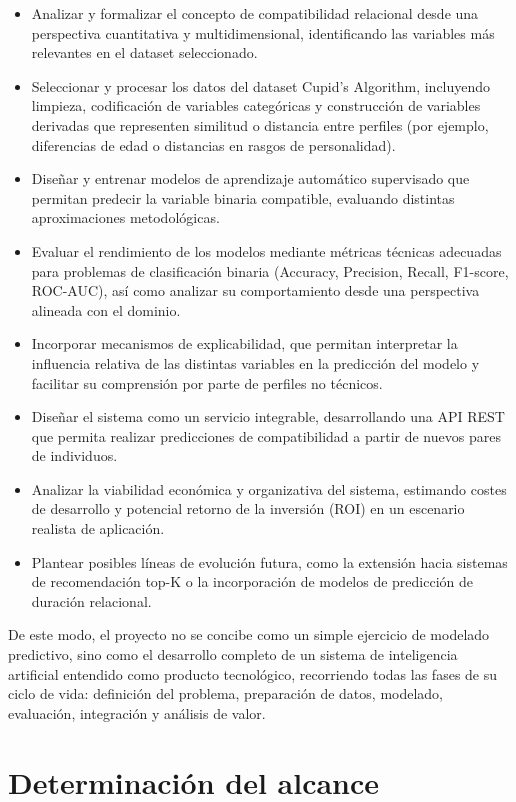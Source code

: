 \begin{itemize}
    \item Analizar y formalizar el concepto de compatibilidad relacional desde una perspectiva cuantitativa y multidimensional, identificando las variables más relevantes en el dataset seleccionado.
    \item Seleccionar y procesar los datos del dataset Cupid’s Algorithm, incluyendo limpieza, codificación de variables categóricas y construcción de variables derivadas que representen similitud o distancia entre perfiles (por ejemplo, diferencias de edad o distancias en rasgos de personalidad).
    \item Diseñar y entrenar modelos de aprendizaje automático supervisado que permitan predecir la variable binaria compatible, evaluando distintas aproximaciones metodológicas.
    \item Evaluar el rendimiento de los modelos mediante métricas técnicas adecuadas para problemas de clasificación binaria (Accuracy, Precision, Recall, F1-score, ROC-AUC), así como analizar su comportamiento desde una perspectiva alineada con el dominio.
    \item Incorporar mecanismos de explicabilidad, que permitan interpretar la influencia relativa de las distintas variables en la predicción del modelo y facilitar su comprensión por parte de perfiles no técnicos.
    \item Diseñar el sistema como un servicio integrable, desarrollando una API REST que permita realizar predicciones de compatibilidad a partir de nuevos pares de individuos.
    \item Analizar la viabilidad económica y organizativa del sistema, estimando costes de desarrollo y potencial retorno de la inversión (ROI) en un escenario realista de aplicación.
    \item Plantear posibles líneas de evolución futura, como la extensión hacia sistemas de recomendación top-K o la incorporación de modelos de predicción de duración relacional.
\end{itemize}

De este modo, el proyecto no se concibe como un simple ejercicio de modelado predictivo, sino como el desarrollo completo de un sistema de inteligencia artificial entendido como producto tecnológico, recorriendo todas las fases de su ciclo de vida: definición del problema, preparación de datos, modelado, evaluación, integración y análisis de valor.

\section{Determinación del alcance}

